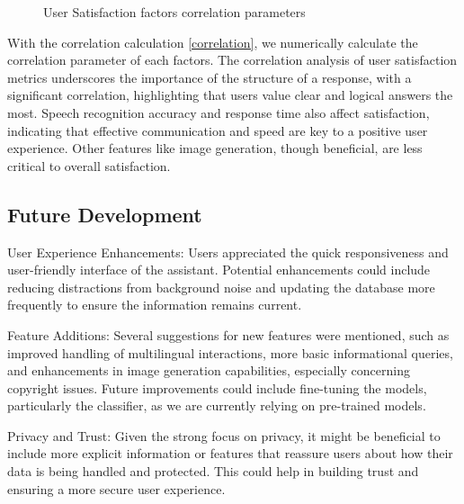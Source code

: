 \documentclass[12pt]{article}
\begin{document}
\begin{figure}[bht]
	\begin{center}
	{}
	\end{center}
	\vspace{-5mm} %
\caption{User Satisfaction factors correlation parameters}
	\label{factorchart}
	\end{figure}
 
With the correlation calculation \eqref{correlation}, we numerically calculate the correlation parameter of each factors. The correlation analysis of user satisfaction metrics underscores the importance of the structure of a response, with a significant correlation, highlighting that users value clear and logical answers the most. Speech recognition accuracy and response time also affect satisfaction, indicating that effective communication and speed are key to a positive user experience. Other features like image generation, though beneficial, are less critical to overall satisfaction.

\subsection{Future Development}
User Experience Enhancements: Users appreciated the quick responsiveness and user-friendly interface of the assistant. Potential enhancements could include reducing distractions from background noise and updating the database more frequently to ensure the information remains current.

Feature Additions: Several suggestions for new features were mentioned, such as improved handling of multilingual interactions, more basic informational queries, and enhancements in image generation capabilities, especially concerning copyright issues. Future improvements could include fine-tuning the models, particularly the classifier, as we are currently relying on pre-trained models.

Privacy and Trust: Given the strong focus on privacy, it might be beneficial to include more explicit information or features that reassure users about how their data is being handled and protected. This could help in building trust and ensuring a more secure user experience.
\end{document}
